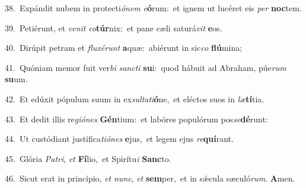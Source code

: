 {\numbfont\textcolor{\numbcolor}{38.}}~Expándit nubem in protecti\-\textit{ó}\-\textit{nem} \textit{e}\-\textbf{ó}rum:~\star et ignem ut lucéret eis \textit{per} \textbf{noc}\-tem.\par
{\numbfont\textcolor{\numbcolor}{39.}}~Petiérunt, et \textit{ve}\-\textit{nit} \textit{co}\-\textbf{túr}nix:~\star et pane cæli saturá\textit{vit} \textbf{e}\-os.\par
{\numbfont\textcolor{\numbcolor}{40.}}~Dirúpit petram et \textit{flu}\-\textit{xé}\textit{runt} \textbf{a}\-quæ:~\star abiérunt in sic\textit{co} \textbf{flú}\-mina;\par
{\numbfont\textcolor{\numbcolor}{41.}}~Quóniam memor fuit ver\textit{bi} \textit{sanc}\-\textit{ti} \textbf{su}\-i:~\star quod hábuit ad Abraham, púe\textit{rum} \textbf{su}\-um.\par
{\numbfont\textcolor{\numbcolor}{42.}}~Et edúxit pópulum suum in ex\-\textit{sul}\-\textit{ta}\textit{ti}\textbf{ó}ne,~\star et eléctos suos in \textit{læ}\-\textbf{tí}tia.\par
{\numbfont\textcolor{\numbcolor}{43.}}~Et dedit illis re\-\textit{gi}\-\textit{ó}\textit{nes} \textbf{Gén}\-tium:~\star et labóres populórum pos\-\textit{se}\-\textbf{dé}runt:\par
{\numbfont\textcolor{\numbcolor}{44.}}~Ut custódiant justifica\-\textit{ti}\-\textit{ó}\textit{nes} \textbf{e}\-jus,~\star et legem ejus \textit{re}\-\textbf{quí}rant.\par
{\numbfont\textcolor{\numbcolor}{45.}}~Glória \textit{Pa}\-\textit{tri}, \textit{et} \textbf{Fí}\-lio,~\star et Spirítu\textit{i} \textbf{Sanc}\-to.\par
{\numbfont\textcolor{\numbcolor}{46.}}~Sicut erat in princípio, \textit{et} \textit{nunc}\-, \textit{et} \textbf{sem}\-per,~\star et in sǽcula sæculó\-\textit{rum}\-. \textbf{A}\-men.\par
